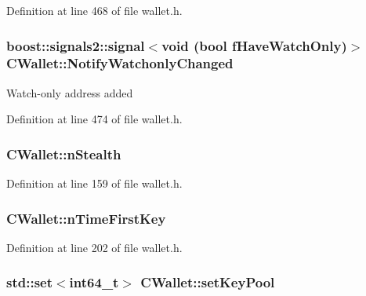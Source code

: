 Definition at line 468 of file wallet.\+h.

\hypertarget{class_c_wallet_a52e8f380ef8d36622381687056d95df8}{}
\subsubsection[{Notify\+Watchonly\+Changed}]{\setlength{\rightskip}{0pt plus 5cm}boost\+::signals2\+::signal$<$void (bool f\+Have\+Watch\+Only)$>$ C\+Wallet\+::\+Notify\+Watchonly\+Changed}\label{class_c_wallet_a52e8f380ef8d36622381687056d95df8}
Watch-\/only address added 

Definition at line 474 of file wallet.\+h.

\hypertarget{class_c_wallet_a9d26635575a63731798ac70047dd9b43}{}
\subsubsection[{n\+Stealth}]{ C\+Wallet\+::n\+Stealth}\label{class_c_wallet_a9d26635575a63731798ac70047dd9b43}


Definition at line 159 of file wallet.\+h.

\hypertarget{class_c_wallet_a817c0d1034377a7bd70a714140a5a8ca}{}
\subsubsection[{n\+Time\+First\+Key}]{ C\+Wallet\+::n\+Time\+First\+Key}\label{class_c_wallet_a817c0d1034377a7bd70a714140a5a8ca}


Definition at line 202 of file wallet.\+h.

\hypertarget{class_c_wallet_a363fabb2b82d596c33e4fa3920a11c26}{}
\subsubsection[{set\+Key\+Pool}]{\setlength{\rightskip}{0pt plus 5cm}std\+::set$<${\bf int64\+\_\+t}$>$ C\+Wallet\+::set\+Key\+Pool}\label{class_c_wallet_a363fabb2b82d596c33e4fa3920a11c26}


